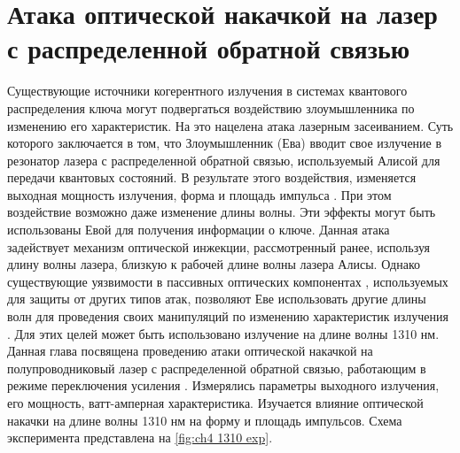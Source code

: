 \section{Атака оптической накачкой на лазер с распределенной обратной связью}\label{sec:ch4/sect1}
Существующие источники когерентного излучения в системах квантового распределения ключа могут подвергаться воздействию злоумышленника по изменению его характеристик. На это нацелена атака лазерным засеиванием. Суть которого заключается в том, что Злоумышленник (Ева) вводит свое излучение в резонатор лазера с распределенной обратной связью, используемый Алисой для передачи квантовых состояний. В результате этого воздействия, изменяется выходная мощность излучения, форма и площадь импульса \cite{huang2019, pang2020}. При этом воздействие возможно даже изменение длины волны. Эти эффекты могут быть использованы Евой для получения информации о ключе.
Данная атака задействует механизм оптической инжекции, рассмотренный ранее, используя длину волны лазера, близкую к рабочей длине волны лазера Алисы.
\newline Однако существующие уязвимости в пассивных оптических компонентах \cite{nasedkin2022, nasedkin2023,borisova2020}, используемых для защиты от других типов атак, позволяют Еве использовать другие длины волн для проведения своих манипуляций по изменению характеристик излучения \cite{lovic2023}. Для этих целей может быть использовано излучение на длине волны 1310 нм. Данная глава посвящена проведению атаки оптической накачкой \cite{svelto1998, okamoto2003,klinkhammer2012, guina2017} на полупроводниковый лазер с распределенной обратной связью, работающим в режиме переключения усиления \cite{svelto2010}. Измерялись параметры выходного излучения, его мощность, ватт-амперная характеристика. Изучается влияние оптической накачки на длине волны 1310 нм на форму и площадь импульсов. 
Схема эксперимента представлена на \ref{fig:ch4 1310 exp}.
